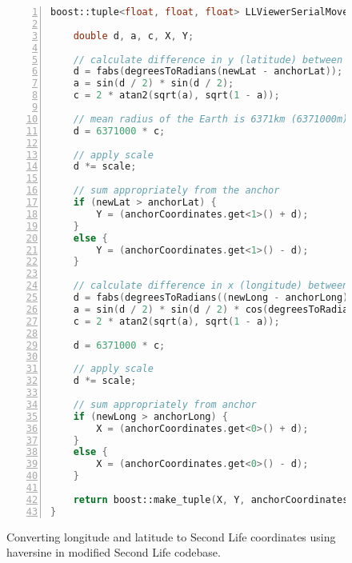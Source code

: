 \begin{figure}[h]
\begin{lstlisting}[language=C++, numbers=left, numberstyle=\small, stepnumber=1, frame=single, breaklines=true, backgroundcolor=\color{codebackground}, showstringspaces=false]
boost::tuple<float, float, float> LLViewerSerialMovement::latitudeLongitudeToRegionCoordinate(double newLat, double newLong, float anchorLat, float anchorLong, float scale, boost::tuple<float, float, float> anchorCoordinates) {

    double d, a, c, X, Y;

    // calculate difference in y (latitude) between anchor & new reading
    d = fabs(degreesToRadians(newLat - anchorLat));
    a = sin(d / 2) * sin(d / 2);
    c = 2 * atan2(sqrt(a), sqrt(1 - a));

    // mean radius of the Earth is 6371km (6371000m)
    d = 6371000 * c;

    // apply scale
    d *= scale;

    // sum appropriately from the anchor
    if (newLat > anchorLat) {
        Y = (anchorCoordinates.get<1>() + d);
    }
    else {
        Y = (anchorCoordinates.get<1>() - d);
    }

    // calculate difference in x (longitude) between anchor & new reading
    d = fabs(degreesToRadians((newLong - anchorLong)));
    a = sin(d / 2) * sin(d / 2) * cos(degreesToRadians(newLat)) * cos(degreesToRadians(anchorLat));
    c = 2 * atan2(sqrt(a), sqrt(1 - a));
    
    d = 6371000 * c;

    // apply scale
    d *= scale;

    // sum appropriately from anchor
    if (newLong > anchorLong) {
        X = (anchorCoordinates.get<0>() + d);
    }
    else {
        X = (anchorCoordinates.get<0>() - d);
    }

    return boost::make_tuple(X, Y, anchorCoordinates.get<2>());
}
\end{lstlisting}
\caption{Converting longitude and latitude to Second Life coordinates using haversine in modified Second Life codebase.}
\label{secondlifehaversine}
\end{figure}


\clearpage


